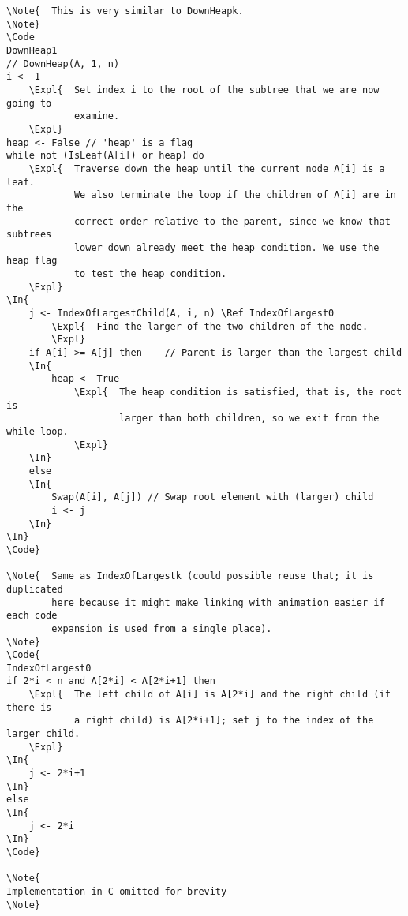 \documentclass[11pt]{article}
\begin{document}
\begin{verbatim}
\Note{  This is very similar to DownHeapk.
\Note}
\Code
DownHeap1
// DownHeap(A, 1, n)
i <- 1
    \Expl{  Set index i to the root of the subtree that we are now going to 
            examine. 
    \Expl}
heap <- False // 'heap' is a flag
while not (IsLeaf(A[i]) or heap) do 
    \Expl{  Traverse down the heap until the current node A[i] is a leaf. 
            We also terminate the loop if the children of A[i] are in the 
            correct order relative to the parent, since we know that subtrees
            lower down already meet the heap condition. We use the heap flag
            to test the heap condition.  
    \Expl}
\In{        
    j <- IndexOfLargestChild(A, i, n) \Ref IndexOfLargest0 
        \Expl{  Find the larger of the two children of the node. 
        \Expl}
    if A[i] >= A[j] then    // Parent is larger than the largest child
    \In{
        heap <- True 
            \Expl{  The heap condition is satisfied, that is, the root is 
                    larger than both children, so we exit from the while loop.
            \Expl}
    \In}
    else
    \In{
        Swap(A[i], A[j]) // Swap root element with (larger) child
        i <- j
    \In}
\In}        
\Code}

\Note{  Same as IndexOfLargestk (could possible reuse that; it is duplicated 
        here because it might make linking with animation easier if each code 
        expansion is used from a single place).
\Note}
\Code{
IndexOfLargest0
if 2*i < n and A[2*i] < A[2*i+1] then
    \Expl{  The left child of A[i] is A[2*i] and the right child (if there is
            a right child) is A[2*i+1]; set j to the index of the larger child.
    \Expl}
\In{
    j <- 2*i+1
\In}
else
\In{
    j <- 2*i
\In}
\Code}

\Note{
Implementation in C omitted for brevity
\Note}

\end{verbatim}
\end{document}
